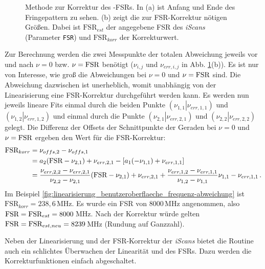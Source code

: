 \begin{figure}[h]
 	\centering
	\caption[\textit{iScan}-FSR-Korrektur -
	Methode]{Methode zur Korrektur des -FSRs. In (a) ist Anfang und
	Ende des Fringepattern zu sehen. (b) zeigt die zur FSR-Korrektur nötigen
	Größen. Dabei ist $\text{FSR}_{est}$ der angegebene FSR des \textit{iScans}
	(Parameter \lstinline|FSR|) und $\text{FSR}_{korr}$ der Korrekturwert.}
	\label{fig:FSR-korrektur}
\end{figure}
Zur Berechnung werden die zwei Messpunkte der totalen Abweichung jeweils vor und
nach $\nu=0$ bzw. $\nu=\text{\lstinline|FSR|}$ benötigt ($\nu_{i,j}$ und
$\nu_{err,i,j}$ in Abb. \ref{fig:FSR-korrektur}(b)). Es ist nur von Interesse,
wie groß die Abweichungen bei $\nu=0$ und $\nu=\text{\lstinline|FSR|}$ sind. Die
Abweichung dazwischen ist unerheblich, womit unabhängig von der Linearisierung eine FSR-Korrektur
durchgeführt werden kann. Es werden nun jeweils lineare Fits einmal durch die
beiden Punkte $(\left.\nu_{1,1}\right|\nu_{err,1,1})$ und
$(\left.\nu_{1,2}\right|\nu_{err,1,2})$ und einmal durch die Punkte
$(\left.\nu_{2,1}\right|\nu_{err,2,1})$ und
$(\left.\nu_{2,2}\right|\nu_{err,2,2})$ gelegt.
Die Differenz der Offsets der Schnittpunkte der Geraden bei $\nu=0$ und
$\nu=\text{\lstinline|FSR|}$ ergeben den Wert für die FSR-Korrektur:
\begin{equation}\label{eq:FSR_korrektur}
	\begin{split}
		\text{FSR}_{korr}
		&=\nu_{offs,2}-\nu_{offs,1}\\
		&=a_2(\text{\lstinline|FSR|}-\nu_{2,1})+\nu_{err,2,1}-[a_1(-\nu_{1,1})+\nu_{err,1,1}]\\
		&=\frac{\nu_{err,2,2}-\nu_{err,2,1}}{\nu_{2,2}-\nu_{2,1}}(\text{\lstinline|FSR|}-\nu_{2,1})+\nu_{err,2,1}+\frac{\nu_{err,1,2}-\nu_{err,1,1}}{\nu_{1,2}-\nu_{1,1}}\nu_{1,1}-\nu_{err,1,1}\,.
	\end{split}
\end{equation}
Im Beispiel \ref{fig:linearisierung_benutzeroberflaeche_frequenz-abweichung}
ist $\text{FSR}_{korr}=238,6\,$MHz. Es wurde ein FSR von $8000\,$MHz angenommen,
also $\text{\lstinline|FSR|}=\text{FSR}_{est}=8000\,$MHz. Nach der Korrektur
würde gelten $\text{\lstinline|FSR|}=\text{FSR}_{est,neu}=8239\,$MHz
(Rundung auf Ganzzahl).\par
Neben der Linearisierung und der FSR-Korrektur der
\textit{iScans} bietet die Routine auch ein schlichtes Überwachen der Linearität
und des FSRs. Dazu werden die Korrekturfunktionen einfach abgeschaltet.

